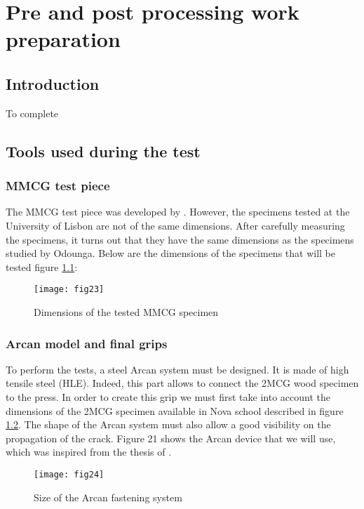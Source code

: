 \chapter{Pre and post processing work preparation}
\label{Chapter2}

\section{Introduction}

To complete

\section{Tools used during the test}

\subsection{MMCG test piece}

The MMCG test piece was developed by \cite{Reference8}. However, the specimens tested at the University of Lisbon are not of the same dimensions. After carefully measuring the specimens, it turns out that they have the same dimensions as the specimens studied by Odounga. Below are the dimensions of the specimens that will be tested figure \ref{fig:fig23}:

\graphicspath{{Images/}}
\begin{figure}[htp]
	\centering
	\texttt{[image: fig23]}
	\caption{Dimensions of the tested MMCG specimen}
	\label{fig:fig23}
\end{figure}

\subsection{Arcan model and final grips}

To perform the tests, a steel Arcan system must be designed. It is made of high tensile steel (HLE). Indeed, this part allows to connect the 2MCG wood specimen to the press. In order to create this grip we must first take into account the dimensions of the 2MCG specimen available in Nova school described in figure \ref{fig:fig24}. The shape of the Arcan system must also allow a good visibility on the propagation of the crack. Figure 21 shows the Arcan device that we will use, which was inspired from the thesis of \cite{Reference9}.

\graphicspath{{Images/}}
\begin{figure}[htp]
	\centering
	\texttt{[image: fig24]}
	\caption{Size of the Arcan fastening system \cite{Reference9}}
	\label{fig:fig24}
\end{figure}

